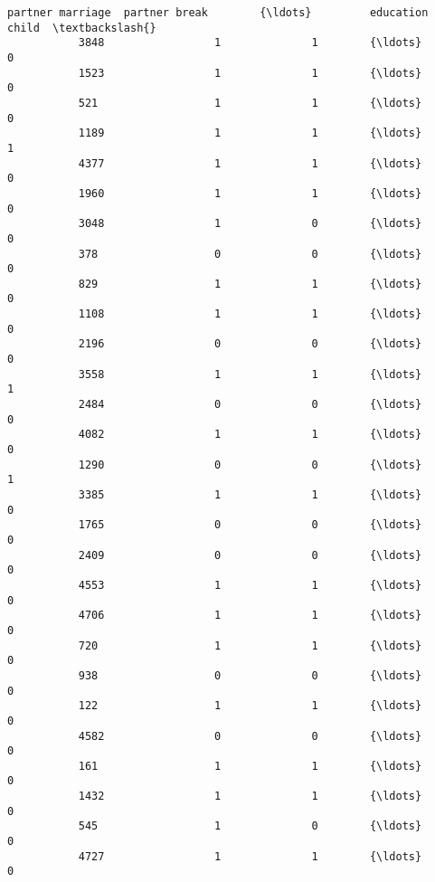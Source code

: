 \documentclass[11pt]{article}
\begin{document}
\begin{Verbatim}[commandchars=\\\{\}]
                 partner marriage  partner break        {\ldots}         education child  \textbackslash{}
           3848                 1              1        {\ldots}                       0   
           1523                 1              1        {\ldots}                       0   
           521                  1              1        {\ldots}                       0   
           1189                 1              1        {\ldots}                       1   
           4377                 1              1        {\ldots}                       0   
           1960                 1              1        {\ldots}                       0   
           3048                 1              0        {\ldots}                       0   
           378                  0              0        {\ldots}                       0   
           829                  1              1        {\ldots}                       0   
           1108                 1              1        {\ldots}                       0   
           2196                 0              0        {\ldots}                       0   
           3558                 1              1        {\ldots}                       1   
           2484                 0              0        {\ldots}                       0   
           4082                 1              1        {\ldots}                       0   
           1290                 0              0        {\ldots}                       1   
           3385                 1              1        {\ldots}                       0   
           1765                 0              0        {\ldots}                       0   
           2409                 0              0        {\ldots}                       0   
           4553                 1              1        {\ldots}                       0   
           4706                 1              1        {\ldots}                       0   
           720                  1              1        {\ldots}                       0   
           938                  0              0        {\ldots}                       0   
           122                  1              1        {\ldots}                       0   
           4582                 0              0        {\ldots}                       0   
           161                  1              1        {\ldots}                       0   
           1432                 1              1        {\ldots}                       0   
           545                  1              0        {\ldots}                       0   
           4727                 1              1        {\ldots}                       0   

\end{Verbatim}
\end{document}

